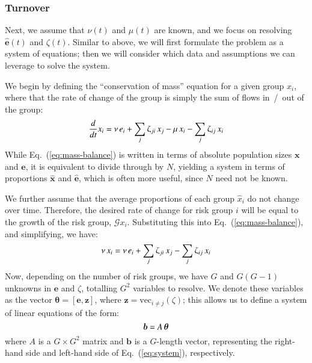 \subsubsection{Turnover}\label{sss:params-turnover}
Next, we assume that $\nu(t)$ and $\mu(t)$ are known,
and we focus on resolving $\bm{\hat{e}}(t)$ and $\zeta(t)$.
Similar to above, we will first formulate the problem as a system of equations;
then we will consider which data and assumptions we can leverage to solve the system.
\par
We begin by defining the ``conservation of mass'' equation for a given group $x_i$,
where that the rate of change of the group
is simply the sum of flows in~/~out of the group:
\begin{equation}\label{eq:mass-balance}
\frac{d}{dt}x_i
= \nu \thinspace e_i + \sum_{j}{\zeta_{ji} \thinspace x_j}
- \mu \thinspace x_i - \sum_{j}{\zeta_{ij} \thinspace x_i}
\end{equation}
While Eq.~(\ref{eq:mass-balance}) is written in terms of
absolute population sizes $\bm{x}$ and $\bm{e}$,
it is equivalent to divide through by $N$, yielding a system in terms of
proportions $\bm{\hat{x}}$ and $\bm{\hat{e}}$,
which is often more useful, since $N$ need not be known.
\par
We further assume that the average proportions of each group $\hat{x}_i$ do not change over time.
Therefore, the desired rate of change for risk group $i$
will be equal to the growth of the risk group, $\mathcal{G} x_i$.
Substituting this into Eq.~(\ref{eq:mass-balance}),
and simplifying, we have:
\begin{equation}\label{eq:system}
\nu \thinspace x_i
= \nu \thinspace e_i + \sum_{j}{\zeta_{ji} \thinspace x_j}
- \sum_{j}{\zeta_{ij} \thinspace x_i}
\end{equation}
Now, depending on the number of risk groups, we have
$G$ and $G(G-1)$ unknowns in $\bm{e}$ and $\zeta$, totalling $G^2$ variables to resolve.
We denote these variables as the vector $\bm{\theta} = \left[\bm{e}, \bm{z}\right]$,
where $\bm{z} = \mathrm{vec}_{i \ne j}(\zeta)$;
this allows us to define
a system of linear equations of the form:
\begin{equation}\label{eq:system-matrix}
\bm{b} = A \thinspace \bm{\theta}
\end{equation}
where $A$ is a $G \times G^2 $ matrix
and $\bm{b}$ is a $G$-length vector,
representing the right-hand side and left-hand side of Eq.~(\ref{eq:system}), respectively.
